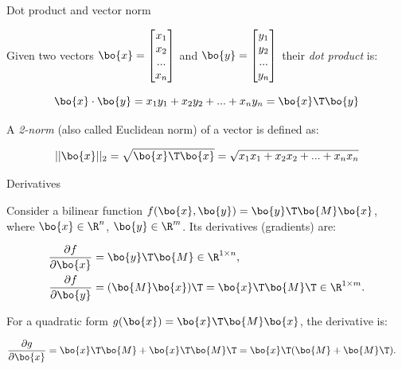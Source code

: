 \documentclass{beamer}
\begin{document}
\begin{frame}{Dot product and vector norm}
	\begin{flushleft}
		
		Given two vectors $\bo{x} = \begin{bmatrix}
			x_1 \\ x_2 \\ ... \\ x_n
		\end{bmatrix}$ and $\bo{y} = \begin{bmatrix}
			y_1 \\ y_2 \\ ... \\ y_n
		\end{bmatrix}$ their \emph{dot product} is:
		
		\begin{equation}
			\bo{x} \cdot \bo{y} = x_1 y_1 + x_2 y_2 + ... + x_n y_n = \bo{x}\T \bo{y}
		\end{equation}
		
		A \emph{2-norm} (also called Euclidean norm) of a vector is defined as:
		
		\begin{equation}
			||\bo{x}||_2 = \sqrt{\bo{x}\T \bo{x}} =  \sqrt{x_1 x_1 + x_2 x_2 + ... + x_n x_n}
		\end{equation}
		
		
	\end{flushleft}
\end{frame}





\begin{frame}{Derivatives}
	\begin{flushleft}
		
		Consider a bilinear function $f(\bo{x}, \bo{y}) = \bo{y}\T \bo{M} \bo{x}$, where $\bo{x} \in \R^n$,  $\bo{y} \in \R^m$. Its derivatives (gradients) are:
		
		\begin{align}
			\frac{\partial f}{\partial \bo{x}} &= \bo{y}\T \bo{M} \in \R^{1 \times n}, 
			\\
			\frac{\partial f}{\partial \bo{y}} &= ( \bo{M} \bo{x})\T =  \bo{x}\T \bo{M}\T \in \R^{1 \times m}.
		\end{align}
		
		For a quadratic form $g(\bo{x}) = \bo{x}\T \bo{M} \bo{x}$, the derivative is:
		
		\begin{align}
			\frac{\partial g}{\partial \bo{x}} &= \bo{x}\T \bo{M} + \bo{x}\T \bo{M}\T = \bo{x}\T (\bo{M} + \bo{M}\T).
		\end{align}
		
		
	\end{flushleft}
\end{frame}
\end{document}
